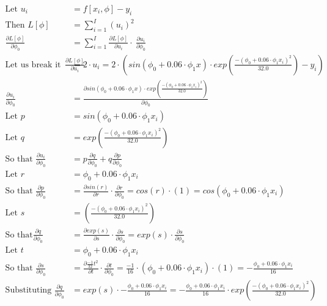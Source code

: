 \documentclass{article}
\begin{document}
\begin{align*}
\text{Let } u_i &= f[x_i, \phi]-y_i \\
\text{Then } L [\phi] &= \sum_{i=1}^{I} (u_i)^2 \\
\frac{\partial{L[\phi]}}{\partial{\phi_0}} &= \sum_{i=1}^{I}  \frac{\partial{L[\phi]}}{\partial{u_i}} \cdot \
 \frac{\partial{u_i}}{\partial{\phi_0}}
 \\
 \text{Let us break it down } \frac{\partial{L[\phi]}}{\partial{u_i}} &= 2 \cdot u_i = 2 \cdot \left( sin(\phi_0 + 0.06 \cdot \phi_1x) \cdot exp  \left( \frac{-(\phi_0 + 0.06 \cdot \phi_1x_i)^2}{32.0} \right) - y_i \right)
 \\
 \frac{\partial{u_i}}{\partial{\phi_0}} &= \frac{\partial{sin(\phi_0 + 0.06 \cdot \phi_1x) \cdot exp  \left( \frac{-(\phi_0 + 0.06 \cdot \phi_1x_i)^2}{32.0} \right)}}{\partial{\phi_0}} \\
 \text{Let } p &= sin(\phi_0 + 0.06 \cdot \phi_1x_i) \\
 \text{Let } q &= exp  \left( \frac{-(\phi_0 + 0.06 \cdot \phi_1x_i)^2}{32.0} \right) \\
 \text{So that } \frac{\partial{u_i}}{\partial{\phi_0}} &= p\frac{\partial{q}}{\partial{\phi_0}} + q \frac{\partial{p}}{\partial{\phi_0}}
 \\
 \text{Let } r &= \phi_0 + 0.06 \cdot \phi_1 x_i
 \\
 \text{So that } \frac{\partial{p}}{\partial{\phi_0}} &= \frac{\partial{sin(r)}}{\partial{r}} \cdot \frac{\partial{r}}{\partial{\phi_0}} = cos (r) \cdot (1) = cos(\phi_0 + 0.06\cdot \phi_1 x_i)
 \\
 \text{Let } s &= \left( \frac{-(\phi_0 + 0.06 \cdot \phi_1x_i)^2}{32.0} \right)
 \\
 \text{So that} \frac{\partial{q}}{\partial{\phi_0}} &= \frac{\partial{exp(s)}}{\partial{s}} \cdot \frac{\partial{s}}{\partial{\phi_0}} = exp(s) \cdot \frac{\partial{s}}{\partial{\phi_0}}
 \\
 \text{Let }t &= \phi_0 + 0.06 \cdot \phi_1x_i
 \\
 \text{So that } \frac{\partial{s}}{\partial{\phi_0}} &= \frac{\partial{\frac{-1}{32}}t^2}{\partial{t}} \cdot \frac{\partial{t}}{\partial{\phi_0}} = \frac{-1}{16} \cdot ( \phi_0 + 0.06 \cdot \phi_1x_i ) \cdot (1) = -\frac{\phi_0 + 0.06 \cdot \phi_1x_i}{16}
 \\
 \text{Substituting } \frac{\partial{q}}{\partial{\phi_0}} &= exp(s) \cdot  -\frac{\phi_0 + 0.06 \cdot \phi_1x_i}{16} = -\frac{\phi_0 + 0.06 \cdot \phi_1x_i}{16} \cdot exp \left( \frac{-(\phi_0 + 0.06 \cdot \phi_1x_i)^2}{32.0} \right)
\end{align*}
\end{document}

